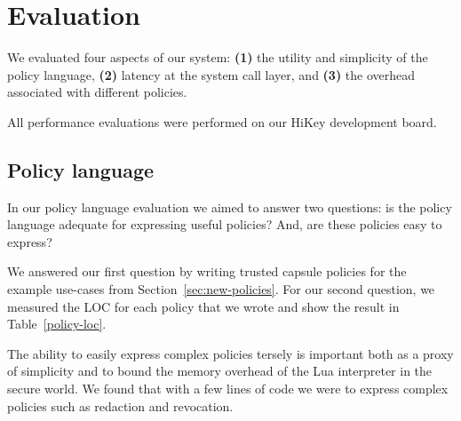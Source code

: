 \chapter{Evaluation}
\label{sec:eval}

We evaluated four aspects of our system: \textbf{(1)} the utility and
simplicity of the policy language, %
\textbf{(2)} latency at the system call layer,
and \textbf{(3)} the overhead associated with different policies. %

All performance evaluations were performed on our HiKey development board. 

 
\section{Policy language}

In our policy language evaluation we aimed to answer two questions: is
the policy language adequate for expressing useful policies? And, are
these policies easy to express?

We answered our first question by writing trusted capsule policies for
the example use-cases from Section~\ref{sec:new-policies}. For our second
question, we measured the LOC for each policy that we wrote and show
the result in Table~\ref{policy-loc}.

The ability to easily express complex policies tersely is important
both as a proxy of simplicity and to bound the memory overhead of the
Lua interpreter in the secure world. We found that with a few lines of
code we were to express complex policies such as redaction and
revocation.


